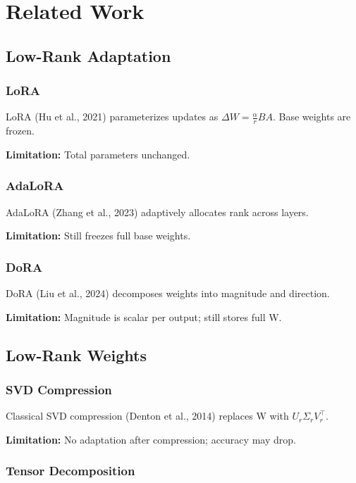 
\section{Related Work}

\subsection{Low-Rank Adaptation}

\subsubsection{LoRA}

LoRA (Hu et al., 2021) parameterizes updates as $\Delta W = \frac{\alpha}{r} BA$. 
Base weights are frozen.

\textbf{Limitation:} Total parameters unchanged.

\subsubsection{AdaLoRA}

AdaLoRA (Zhang et al., 2023) adaptively allocates rank across layers.

\textbf{Limitation:} Still freezes full base weights.

\subsubsection{DoRA}

DoRA (Liu et al., 2024) decomposes weights into magnitude and direction.

\textbf{Limitation:} Magnitude is scalar per output; still stores full W.

\subsection{Low-Rank Weights}

\subsubsection{SVD Compression}

Classical SVD compression (Denton et al., 2014) replaces W with $U_r \Sigma_r V_r^\top$.

\textbf{Limitation:} No adaptation after compression; accuracy may drop.

\subsubsection{Tensor Decomposition}

